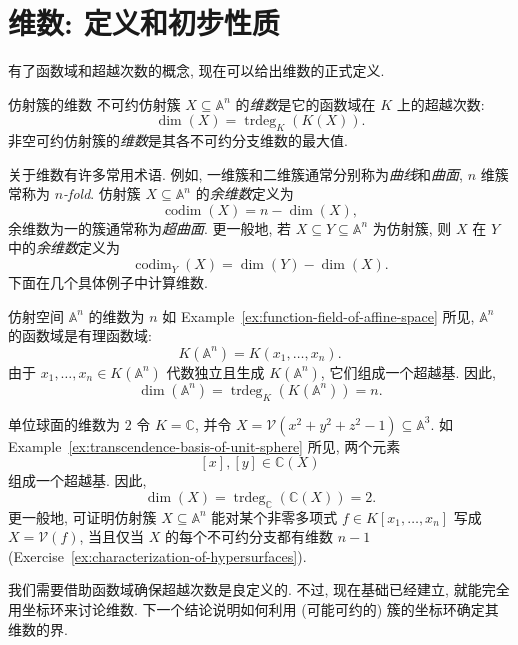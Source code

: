 \section{维数: 定义和初步性质}\label{sec:dimension-of-affine-varieties}

有了函数域和超越次数的概念, 现在可以给出维数的正式定义.

\begin{Definition}{仿射簇的维数}\leavevmode\label{def:dimension-of-affine-variety}
不可约仿射簇 $X\subseteq\mathbb{A}^{n}$ 的\emph{维数}是它的函数域在 $K$ 上的超越次数:
\[
  \dim(X)=\operatorname{trdeg}_{K}(K(X)).
\]
非空可约仿射簇的\emph{维数}是其各不可约分支维数的最大值.
\end{Definition}

关于维数有许多常用术语. 例如, 一维簇和二维簇通常分别称为\emph{曲线}和\emph{曲面}, $n$ 维簇常称为 \emph{$n$-fold}. 仿射簇 $X\subseteq\mathbb{A}^{n}$ 的\emph{余维数}定义为
\[
  \operatorname{codim}(X)=n-\dim(X),
\]
余维数为一的簇通常称为\emph{超曲面}. 更一般地, 若 $X\subseteq Y\subseteq\mathbb{A}^{n}$ 为仿射簇, 则 $X$ 在 $Y$ 中的\emph{余维数}定义为
\[
  \operatorname{codim}_{Y}(X)=\dim(Y)-\dim(X).
\]
下面在几个具体例子中计算维数.

\begin{Example}{仿射空间 $\mathbb{A}^{n}$ 的维数为 $n$}\leavevmode\label{ex:dimension-of-affine-space}
如 Example~\ref{ex:function-field-of-affine-space} 所见, $\mathbb{A}^{n}$ 的函数域是有理函数域:
\[
  K(\mathbb{A}^{n})=K(x_{1},\ldots,x_{n}).
\]
由于 $x_{1},\ldots,x_{n}\in K(\mathbb{A}^{n})$ 代数独立且生成 $K(\mathbb{A}^{n})$, 它们组成一个超越基. 因此,
\[
  \dim(\mathbb{A}^{n})=\operatorname{trdeg}_{K}(K(\mathbb{A}^{n}))=n.
\]
\end{Example}

\begin{Example}{单位球面的维数为 $2$}\leavevmode\label{ex:dimension-of-unit-sphere}
令 $K=\mathbb{C}$, 并令 $X=\mathcal{V}(x^{2}+y^{2}+z^{2}-1)\subseteq\mathbb{A}^{3}$. 如 Example~\ref{ex:transcendence-basis-of-unit-sphere} 所见, 两个元素
\[
  [x],[y]\in\mathbb{C}(X)
\]
组成一个超越基. 因此,
\[
  \dim(X)=\operatorname{trdeg}_{\mathbb{C}}(\mathbb{C}(X))=2.
\]
更一般地, 可证明仿射簇 $X\subseteq\mathbb{A}^{n}$ 能对某个非零多项式 $f\in K[x_{1},\ldots,x_{n}]$ 写成 $X=\mathcal{V}(f)$, 当且仅当 $X$ 的每个不可约分支都有维数 $n-1$ (Exercise~\ref{ex:characterization-of-hypersurfaces}).
\end{Example}

我们需要借助函数域确保超越次数是良定义的. 不过, 现在基础已经建立, 就能完全用坐标环来讨论维数. 下一个结论说明如何利用 (可能可约的) 簇的坐标环确定其维数的界.

